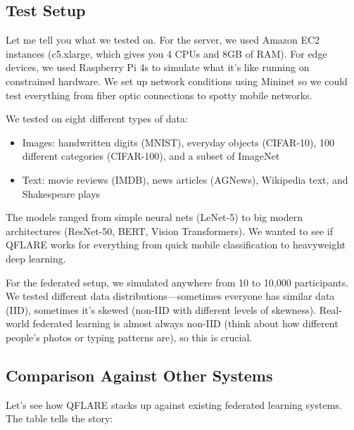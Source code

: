 \documentclass[journal,onecolumn]{IEEEtran}
\begin{document}
\subsection{Test Setup}

Let me tell you what we tested on. For the server, we used Amazon EC2 instances (c5.xlarge, which gives you 4 CPUs and 8GB of RAM). For edge devices, we used Raspberry Pi 4s to simulate what it's like running on constrained hardware. We set up network conditions using Mininet so we could test everything from fiber optic connections to spotty mobile networks.

We tested on eight different types of data:
\begin{itemize}
\item Images: handwritten digits (MNIST), everyday objects (CIFAR-10), 100 different categories (CIFAR-100), and a subset of ImageNet
\item Text: movie reviews (IMDB), news articles (AGNews), Wikipedia text, and Shakespeare plays
\end{itemize}

The models ranged from simple neural nets (LeNet-5) to big modern architectures (ResNet-50, BERT, Vision Transformers). We wanted to see if QFLARE works for everything from quick mobile classification to heavyweight deep learning.

For the federated setup, we simulated anywhere from 10 to 10,000 participants. We tested different data distributions—sometimes everyone has similar data (IID), sometimes it's skewed (non-IID with different levels of skewness). Real-world federated learning is almost always non-IID (think about how different people's photos or typing patterns are), so this is crucial.

\subsection{Comparison Against Other Systems}

Let's see how QFLARE stacks up against existing federated learning systems. The table tells the story:
\end{document}
